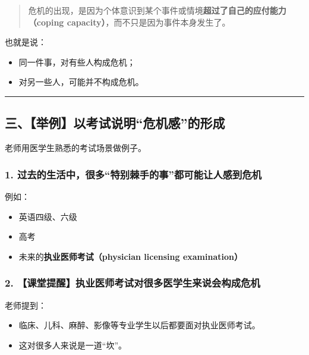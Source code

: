 \documentclass[
  chinese,
  9pt,
  a4paper,
]{ctexart}
\providecommand{\tightlist}{%
  \setlength{\itemsep}{0pt}\setlength{\parskip}{0pt}}
\begin{document}
\begin{quote}
危机的出现，是因为个体意识到某个事件或情境\textbf{超过了自己的应付能力（coping
capacity）}，而不只是因为事件本身发生了。
\end{quote}

也就是说：

\begin{itemize}
\tightlist
\item
  同一件事，对有些人构成危机；
\item
  对另一些人，可能并不构成危机。
\end{itemize}

\begin{center}\rule{0.5\linewidth}{0.5pt}\end{center}

\subsection{三、【举例】以考试说明``危机感''的形成}\label{ux4e09ux4e3eux4f8bux4ee5ux8003ux8bd5ux8bf4ux660eux5371ux673aux611fux7684ux5f62ux6210}

老师用医学生熟悉的考试场景做例子。

\subsubsection{1.
过去的生活中，很多``特别棘手的事''都可能让人感到危机}\label{ux8fc7ux53bbux7684ux751fux6d3bux4e2dux5f88ux591aux7279ux522bux68d8ux624bux7684ux4e8bux90fdux53efux80fdux8ba9ux4ebaux611fux5230ux5371ux673a}

例如：

\begin{itemize}
\tightlist
\item
  英语四级、六级
\item
  高考
\item
  未来的\textbf{执业医师考试（physician licensing examination）}
\end{itemize}

\subsubsection{2.
【课堂提醒】执业医师考试对很多医学生来说会构成危机}\label{ux8bfeux5802ux63d0ux9192ux6267ux4e1aux533bux5e08ux8003ux8bd5ux5bf9ux5f88ux591aux533bux5b66ux751fux6765ux8bf4ux4f1aux6784ux6210ux5371ux673a}

老师提到：

\begin{itemize}
\tightlist
\item
  临床、儿科、麻醉、影像等专业学生以后都要面对执业医师考试。
\item
  这对很多人来说是一道``坎''。
\end{itemize}
\end{document}
